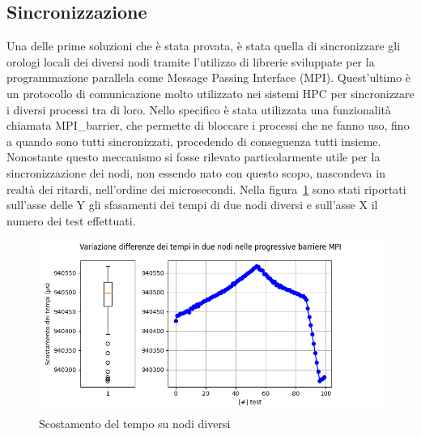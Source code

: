 \subsection{Sincronizzazione}\label{sec:timesync}
Una delle prime soluzioni che è stata provata, è stata quella di sincronizzare gli orologi locali dei diversi nodi tramite l'utilizzo di librerie sviluppate per la programmazione parallela come Message Passing Interface (MPI). Quest'ultimo è un protocollo di comunicazione molto utilizzato nei sistemi HPC per sincronizzare i diversi processi tra di loro.
Nello specifico è stata utilizzata una funzionalità chiamata MPI\_barrier, che permette di bloccare i processi che ne fanno uso, fino a quando sono tutti sincronizzati, procedendo di conseguenza tutti insieme. 
Nonostante questo meccanismo si fosse rilevato particolarmente utile per la sincronizzazione dei nodi, non essendo nato con questo scopo, nascondeva in realtà dei ritardi, nell'ordine dei microsecondi. Nella figura~\ref{fig:sync_time_shift1} sono stati riportati sull'asse delle Y gli sfasamenti dei tempi di due nodi diversi e sull'asse X il numero dei test effettuati.

\begin{figure}[H]
    \centering
    \includegraphics[width=\textwidth]{./results/time_sync_node.png}
    \caption{Scostamento del tempo su nodi diversi}\label{fig:sync_time_shift1}
\end{figure}

